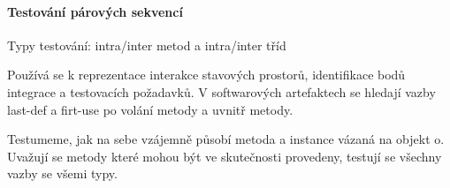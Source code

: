 \paragraph{Testování párových sekvencí}

Typy testování: intra/inter metod a intra/inter tříd

Používá se k reprezentace interakce stavových prostorů, identifikace bodů integrace a testovacích požadavků. V softwarových artefaktech se hledají vazby last-def a firt-use po volání metody a uvnitř metody.

Testumeme, jak na sebe vzájemně působí metoda a instance vázaná na objekt o. Uvažují se metody které mohou být ve skutečnosti provedeny, testují se všechny vazby se všemi typy.
